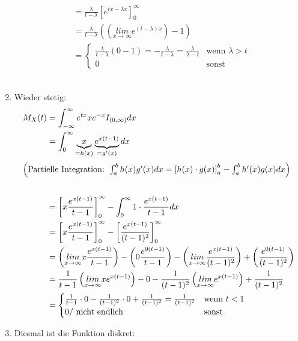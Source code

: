 \documentclass{article}
\begin{document}
\begin{enumerate}[label= zu \roman*)]
\begin{align*}
                &= \frac{\lambda}{t -\lambda} \left[e^{tx  - \lambda x}\right]_0^{\infty} \\
                &= \frac{\lambda}{t - \lambda} \left((\underset{x \rightarrow \infty}{lim} e^{(t-\lambda) x})-  1\right) \\
                &= \begin{cases}
                    \frac{\lambda}{t - \lambda}(0 - 1) = -\frac{\lambda}{t - \lambda} = \frac{\lambda}{\lambda - t} &\text{wenn } \lambda > t \\
                    0 &\text{sonst }
                \end{cases}
            \end{align*} \\
    \item Wieder stetig: \begin{align*}
        M_X(t)&= \int_{-\infty}^{\infty}e^{tx}xe^{-x} I_{(0, \infty)} dx\\
        &=\int_{0}^{\infty} \underbrace{x}_{= h(x)} \underbrace{e^{x(t-1)}}_{= g'(x)} dx \\
        \intertext{$\left(\text{Partielle Integration: } \int_a^b h(x) g'(x) dx = \left[h(x)\cdot g(x)\right]_a^b - \int_a^b h'(x) g(x) dx\right) $} \\
        &= \left[x \frac{e^{x (t-1)}}{t-1}\right]_0^{\infty} - \int_{0}^{\infty} 1 \cdot \frac{e^{x(t-1)}}{t-1} dx \\
        &= \left[x \frac{e^{x (t-1)}}{t-1}\right]_0^{\infty} - \left[\frac{e^{x(t-1)}}{(t-1)^2}\right]_0^{\infty} \\
        &= \left(\underset{x \rightarrow \infty}{lim} x \frac{e^{x (t-1)}}{t-1} \right) - \left(0 \frac{e^{0 (t-1)}}{t-1}\right) - \left(\underset{x \rightarrow \infty}{lim}\frac{e^{x(t-1)}}{(t-1)^2}\right) + \left(\frac{e^{0(t-1)}}{(t-1)^2}\right) \\
        &= \frac{1}{t-1}\left(\underset{x \rightarrow \infty}{lim} x e^{x (t-1)} \right) - 0 - \frac{1}{(t-1)^2}\left(\underset{x \rightarrow \infty}{lim}e^{x(t-1)}\right) + \frac{1}{(t-1)^2} \\
        &=  \begin{cases}
            \frac{1}{t-1} \cdot 0 -  \frac{1}{(t-1)^2} \cdot 0 + \frac{1}{(t-1)^2} = \frac{1}{(t-1)^2} &\text{wenn } t < 1 \\
            0\text{/ nicht endlich}& \text{sonst }
            \end{cases}
        \end{align*} 
    \item Diesmal ist die Funktion diskret: \begin{align*}

\end{align*}
\end{enumerate}
\end{document}
